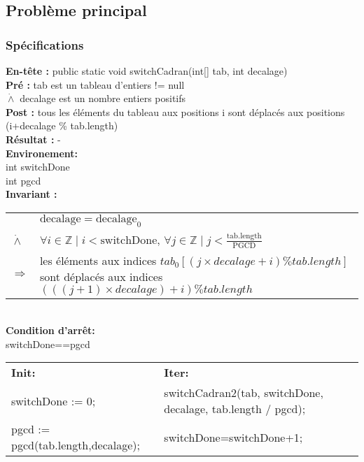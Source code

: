 \subsection{Problème principal}
\subsubsection*{Spécifications}
\noindent \textbf{En-tête :} public static void switchCadran(int[] tab, int decalage)\\
\noindent \textbf{Pré :} tab est un tableau d'entiers != null\\
\indent $\dot{\wedge}$ decalage est un nombre entiers positifs\\
\textbf{Post :} tous les éléments du tableau aux positions i sont déplacés aux positions (i+decalage \% tab.length)\\
\textbf{Résultat :} - \\

\noindent \textbf{Environement: }\\
int switchDone\\
int pgcd\\

\noindent \textbf{Invariant :}

\begin{tabular}{lp{14cm}}

& $\mathrm{decalage}=\mathrm{decalage}_{0}$ \\
$\dot{\wedge}$ & $\forall i \in \mathbb{Z} \mid i < \mathrm{switchDone} $, $\forall j \in \mathbb{Z} \mid j < \frac{\mathrm{tab.length}}{\mathrm{PGCD}}$ \\
$\Rightarrow$ & les éléments aux indices $tab_{0}[(j \times decalage + i) \% tab.length]$ sont déplacés aux indices $(((j+1)\times decalage)+i) \% tab.length$ \\
\end{tabular}\\

\noindent \textbf{Condition d'arrêt: }\\
switchDone==pgcd \\

\noindent \begin{tabular}{l|l}
\textbf{Init: } & \textbf{Iter: }\\
switchDone := 0; & switchCadran2(tab, switchDone, decalage, tab.length / pgcd); \\
pgcd := pgcd(tab.length,decalage); & switchDone=switchDone+1;\\
\end{tabular}\\

